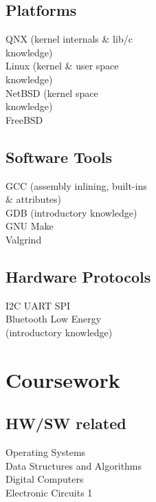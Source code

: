 \documentclass[letterpaper, 10pt]{deedy-resume} %
\begin{document}
{\begin{minipage}[t]{0.30\textwidth}
\sectionspace
\sectionspace

\subsection{Platforms}
\textbullet{} QNX (kernel internals \& lib/c \\
\hspace{2.5mm} knowledge) \\
\textbullet{} Linux (kernel \& user space \\
\hspace{2.5mm} knowledge) \\
\textbullet{} NetBSD (kernel space \\
\hspace{2.5mm} knowledge) \\
\textbullet{} FreeBSD \\
\sectionspace %
\sectionspace
\subsection{Software Tools}
\textbullet{} GCC (assembly inlining, built-ins \\
\hspace{2.5mm} \& attributes) \\ 
\textbullet{} GDB (introductory knowledge)\\
\textbullet{} GNU Make \\
\textbullet{} Valgrind 

\sectionspace %
\sectionspace
\subsection{Hardware Protocols}

\textbullet{} I2C \textbullet{} UART \textbullet{} SPI \\
\textbullet{} Bluetooth Low Energy \\ 
\hspace{2.5mm} (introductory knowledge) \\
\sectionspace %


\section{Coursework}
\subsection{HW/SW related}
\textbullet{} Operating Systems \\
\textbullet{} Data Structures and Algorithms \\
\textbullet{} Digital Computers \\
\textbullet{} Electronic Circuits 1\\
\sectionspace %


\end{minipage}}
\end{document}
